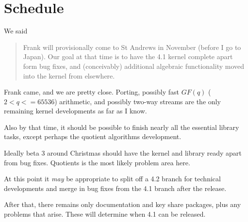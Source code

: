 \documentclass[12pt]{article}
\begin{document}
\section{Schedule}

We said
\begin{quote}
Frank will provisionally come to St Andrews in November (before I go
to Japan). Our goal at that time is to have the 4.1 kernel complete apart
form bug fixes, and (conceivably) additional algebraic functionality
moved into the kernel from elsewhere.  
\end{quote}
Frank came, and we are pretty close. Porting, possibly fast $GF(q)$
($2 < q <= 65536$) arithmetic, and possibly two-way streams are the
only remaining kernel developments as far as I know.

Also by that time, it should be possible to finish nearly all the
essential library tasks, except perhaps the quotient algorithms
development.

Ideally beta 3 around Christmas should have the kernel and library
ready apart from bug fixes. Quotients is the most likely problem area here.

At this point it \emph{may} be appropriate to split off a 4.2 branch for
technical developments and merge in bug fixes from the 4.1 branch
after the release.

After that, there remains only documentation and key share packages,
plus any problems that arise. These will determine when 4.1 can
be released.
\end{document}
